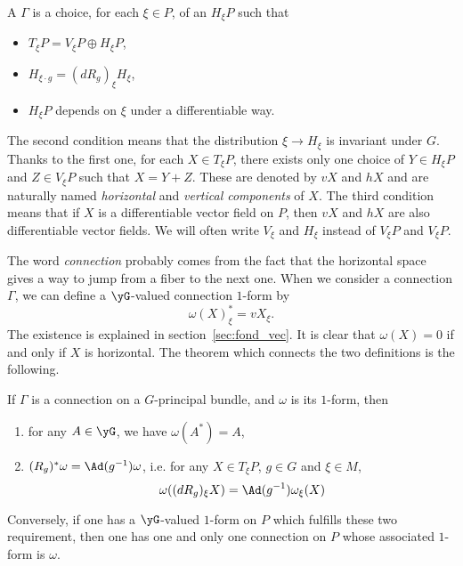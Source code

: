 A  $\Gamma$ is a choice, for each $\xi\in P$, of an  $H_{\xi} P$ such that

\begin{itemize}
\item $T_{\xi} P=V_{\xi} P\oplus H_{\xi} P$,
\item $H_{\xi\cdot g}=(dR_g)_{\xi} H_{\xi}$,
\item $H_{\xi} P$ depends on $\xi$ under a differentiable way.
\end{itemize}
The second condition means that the distribution $\xi\to H_{\xi}$ is invariant under $G$. Thanks to the first one, for each $X\in T_{\xi} P$, there exists only one choice of $Y\in H_{\xi} P$ and $Z\in V_{\xi} P$ such that $X=Y+Z$. These are denoted by $vX$ and $hX$ and are naturally named \emph{horizontal} and \emph{vertical components} of $X$. The third condition means that if $X$ is a differentiable vector field on $P$, then $vX$ and $hX$ are also differentiable vector fields. We will often write $V_{\xi}$ and $H_{\xi}$ instead of $V_{\xi} P$ and $V_{\xi} P$.

The word \emph{connection} probably comes from the fact that the horizontal space gives a way to jump from a fiber to the next one.
When we consider a connection $\Gamma$, we can define a $\yG$-valued connection $1$-form by
\[
   \omega(X)^*_{\xi}=vX_{\xi}.
\]
The existence is explained in section~\ref{sec:fond_vec}. It is clear that $\omega(X)=0$ if and only if $X$ is horizontal. The theorem which connects the two definitions is the following.

\begin{theorem}
If $\Gamma$ is a connection on a $G$-principal bundle, and $\omega$ is its $1$-form, then

\begin{enumerate}
\item\label{enuyai} for any $A\in\yG$, we have $\omega(A^*)=A$,
\item\label{enuyaii} $(R_g)^*\omega=\Ad(g^{-1})\omega$, i.e. for any $X\in T_{\xi} P$, $g\in G$ and $\xi\in M$,
\[
    \omega((dR_g)_{\xi} X)=\Ad(g^{-1})\omega_{\xi}(X)
\]
\end{enumerate}
Conversely, if one has a $\yG$-valued $1$-form on $P$ which fulfills these two requirement, then one has one and only one connection on $P$ whose associated $1$-form is $\omega$.

\end{theorem}

